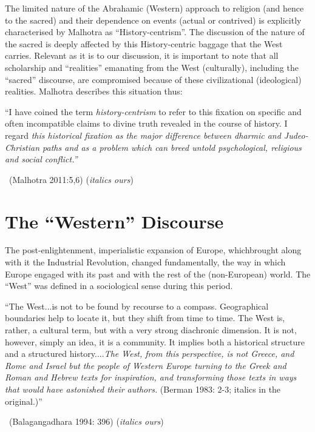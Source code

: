 The limited nature of the Abrahamic (Western) approach to religion (and hence to the sacred) and their dependence on events (actual or contrived) is explicitly characterised by Malhotra as “History-centrism”. The discussion of the nature of the sacred is deeply affected by this History-centric baggage that the West carries. Relevant as it is to our discussion, it is important to note that all scholarship and “realities” emanating from the West (culturally), including the “sacred” discourse, are compromised because of these civilizational (ideological) realities. Malhotra describes this situation thus:

\begin{myquote}
“I have coined the term \textit{history-centrism} to refer to this fixation on specific and often incompatible claims to divine truth revealed in the course of history. I regard \textit{this historical fixation as the major difference between dharmic and Judeo-Christian paths and as a problem which can breed untold psychological, religious and social conflict.”} 

~\hfill (Malhotra 2011:5,6) (\textit{italics ours})
\end{myquote}


\section*{The “Western” Discourse}

The post-enlightenment, imperialistic expansion of Europe, which\break brought along with it the Industrial Revolution, changed fundamentally, the way in which Europe engaged with its past and with the rest of the (non-European) world. The “West” was defined in a sociological sense during this period.

\begin{myquote}
“The West...is not to be found by recourse to a compass. Geographical boundaries help to locate it, but they shift from time to time. The West is, rather, a cultural term, but with a very strong diachronic dimension. It is not, however, simply an idea, it is a community. It implies both a historical structure and a structured history....\textit{The West, from this perspective, is not Greece, and Rome and Israel but the people of Western Europe turning to the Greek and Roman and Hebrew texts for inspiration, and transforming those texts in ways that would have astonished their authors.} (Berman 1983: 2-3; italics in the original.)” 

~\hfill (Balagangadhara 1994: 396) (\textit{italics ours})
\end{myquote}

